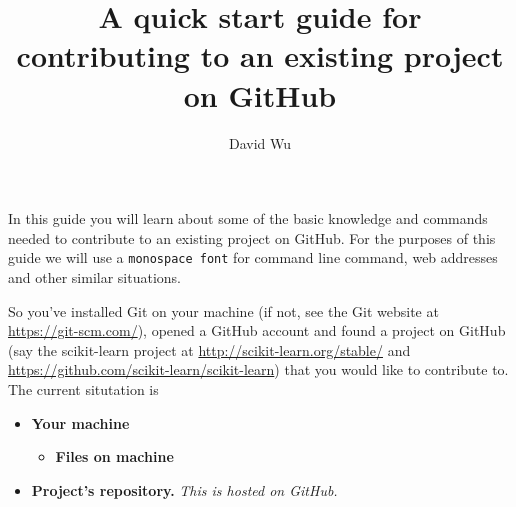 \documentclass[11pt]{amsart}
\newcommand{\code}[1]{\texttt{#1}}
\begin{document}
\pagestyle{plain}

\title{A quick start guide for contributing to an existing project on GitHub}
\author{David Wu}

\maketitle

In this guide you will learn about some of the basic knowledge and commands needed to contribute to an existing project on GitHub. For the purposes of this guide we will use a \code{monospace font} for command line command, web addresses and other similar situations.

So you've installed Git on your machine (if not, see the Git website at \url{https://git-scm.com/}), opened a GitHub account and found a project on GitHub (say the scikit-learn project at \url{http://scikit-learn.org/stable/} and \url{https://github.com/scikit-learn/scikit-learn}) that you would like to contribute to. The current situtation is

\begin{itemize}
    \item \textbf{Your machine}
    \begin{itemize}
        \item \textbf{Files on machine}
    \end{itemize}
    \item \textbf{Project's repository.} \emph{This is hosted on GitHub.}
\end{itemize}
\end{document}
